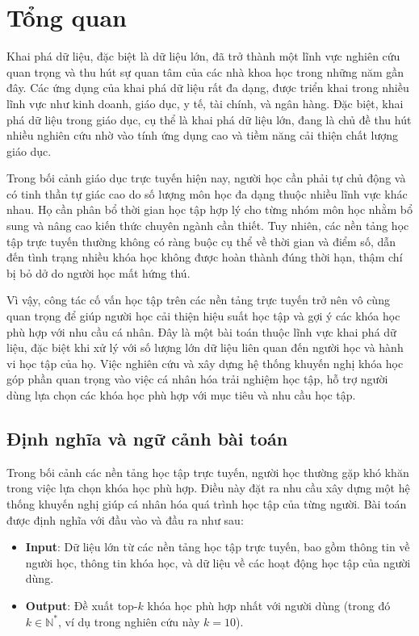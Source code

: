 \section{Tổng quan}

Khai phá dữ liệu, đặc biệt là dữ liệu lớn, đã trở thành một lĩnh vực nghiên cứu quan trọng và thu hút sự quan tâm của các nhà khoa học trong những năm gần đây. Các ứng dụng của khai phá dữ liệu rất đa dạng, được triển khai trong nhiều lĩnh vực như kinh doanh, giáo dục, y tế, tài chính, và ngân hàng. Đặc biệt, khai phá dữ liệu trong giáo dục, cụ thể là khai phá dữ liệu lớn, đang là chủ đề thu hút nhiều nghiên cứu nhờ vào tính ứng dụng cao và tiềm năng cải thiện chất lượng giáo dục.

Trong bối cảnh giáo dục trực tuyến hiện nay, người học cần phải tự chủ động và có tinh thần tự giác cao do số lượng môn học đa dạng thuộc nhiều lĩnh vực khác nhau. Họ cần phân bổ thời gian học tập hợp lý cho từng nhóm môn học nhằm bổ sung và nâng cao kiến thức chuyên ngành cần thiết. Tuy nhiên, các nền tảng học tập trực tuyến thường không có ràng buộc cụ thể về thời gian và điểm số, dẫn đến tình trạng nhiều khóa học không được hoàn thành đúng thời hạn, thậm chí bị bỏ dở do người học mất hứng thú.

Vì vậy, công tác cố vấn học tập trên các nền tảng trực tuyến trở nên vô cùng quan trọng để giúp người học cải thiện hiệu suất học tập và gợi ý các khóa học phù hợp với nhu cầu cá nhân. Đây là một bài toán thuộc lĩnh vực khai phá dữ liệu, đặc biệt khi xử lý với số lượng lớn dữ liệu liên quan đến người học và hành vi học tập của họ. Việc nghiên cứu và xây dựng hệ thống khuyến nghị khóa học góp phần quan trọng vào việc cá nhân hóa trải nghiệm học tập, hỗ trợ người dùng lựa chọn các khóa học phù hợp với mục tiêu và nhu cầu học tập.

\subsection{Định nghĩa và ngữ cảnh bài toán}

Trong bối cảnh các nền tảng học tập trực tuyến, người học thường gặp khó khăn trong việc lựa chọn khóa học phù hợp. Điều này đặt ra nhu cầu xây dựng một hệ thống khuyến nghị giúp cá nhân hóa quá trình học tập của từng người. Bài toán được định nghĩa với đầu vào và đầu ra như sau:

\begin{itemize}
    \item \textbf{Input}: Dữ liệu lớn từ các nền tảng học tập trực tuyến, bao gồm thông tin về người học, thông tin khóa học, và dữ liệu về các hoạt động học tập của người dùng.
    \item \textbf{Output}: Đề xuất top-$k$ khóa học phù hợp nhất với người dùng (trong đó $k \in \mathbb{N}^*$, ví dụ trong nghiên cứu này $k=10$).
\end{itemize}

